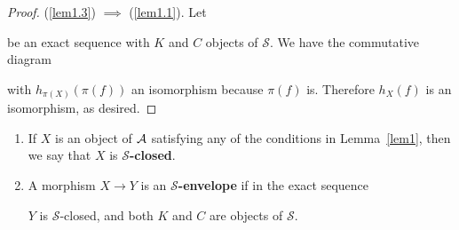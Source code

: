 \documentclass[dissertation.tex]{subfiles}
\begin{document}
\begin{lem}
\begin{proof}
    (\ref{lem1.3}) $\implies$ (\ref{lem1.1}).  Let
    \begin{center}
    \end{center}
    be an exact sequence with $K$ and $C$ objects of $\mathcal{S}$.
    We have the commutative diagram
    \begin{center}
    \end{center}
    with $h_{\pi(X)}(\pi(f))$ an isomorphism because $\pi(f)$ is.
    Therefore $h_X(f)$ is an isomorphism, as desired.
  \end{proof}
\end{lem}

\begin{defn}
  \begin{enumerate}
  \item
    If $X$ is an object of $\mathcal{A}$ satisfying any of the conditions in Lemma~\ref{lem1}, then we say that $X$ is \textbf{$\mathcal{S}$-closed}.
  \item
    A morphism $X \rightarrow Y$ is an \textbf{$\mathcal{S}$-envelope} if in the exact sequence
    \begin{center}
    \end{center}
    $Y$ is $\mathcal{S}$-closed, and both $K$ and $C$ are objects of $\mathcal{S}$.
  \end{enumerate}
\end{defn}
\end{document}
